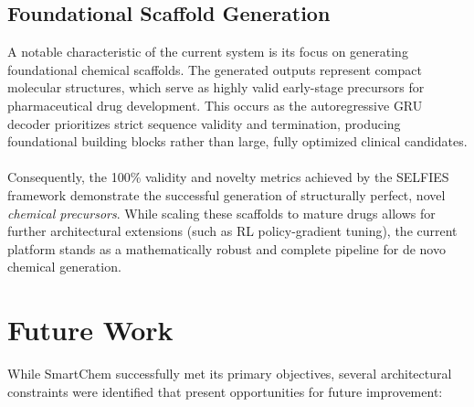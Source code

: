 \documentclass[12pt,a4paper]{report}
\begin{document}
\subsection*{Foundational Scaffold Generation}
A notable characteristic of the current system is its focus on generating foundational chemical scaffolds. The generated outputs represent compact molecular structures, which serve as highly valid early-stage precursors for pharmaceutical drug development. This occurs as the autoregressive GRU decoder prioritizes strict sequence validity and termination, producing foundational building blocks rather than large, fully optimized clinical candidates. 
\\ \\
Consequently, the 100\% validity and novelty metrics achieved by the SELFIES framework demonstrate the successful generation of structurally perfect, novel \textit{chemical precursors}. While scaling these scaffolds to mature drugs allows for further architectural extensions (such as RL policy-gradient tuning), the current platform stands as a mathematically robust and complete pipeline for de novo chemical generation.

\section{Future Work}

While SmartChem successfully met its primary objectives, several architectural constraints were identified that present opportunities for future improvement:
\end{document}
